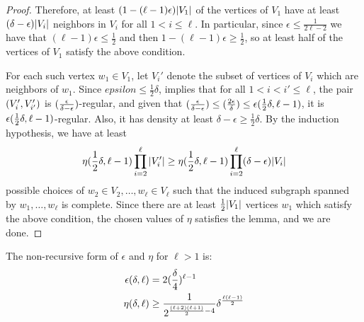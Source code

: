 \begin{lemma}
\begin{proof}
                Therefore, at least $(1 - (\ell -1) \epsilon) | V_1 |$ of the vertices of $V_1$ have at least
                $(\delta - \epsilon) | V_i |$ neighbors in $V_i$ for all $1 < i \leq \ell$.
                In particular, since $\epsilon \leq \frac{1}{2\ell - 2}$ we have that $(\ell - 1) \epsilon \leq \frac{1}{2}$
                and then $1 - (\ell - 1) \epsilon \geq \frac{1}{2}$, so at least half of the vertices of $V_1$ satisfy the
                above condition.

                For each such vertex $w_1 \in V_1$, let $V_i'$ denote the subset of vertices of $V_i$ which are neighbors
                of $w_1$.
                Since $epsilon \leq \frac{1}{2}\delta$,  implies that for all
                $1 < i < i' \leq \ell$, the pair $( V_i', V_{i'}' )$ is $( \frac{\epsilon}{\delta-\epsilon} )$-regular,
                and given that $( \frac{\epsilon}{\delta-\epsilon} ) \leq ( \frac{2\epsilon}{\delta} ) \leq \epsilon( \frac{1}{2}\delta, \ell-1 )$,
                it is $\epsilon( \frac{1}{2}\delta, \ell-1 )$-regular.
                Also, it has density at least $\delta - \epsilon \geq \frac{1}{2} \delta$.
                By the induction hypothesis, we have at least
                \[
                    \eta ( \frac{1}{2}\delta, \ell-1 ) \prod_{i=2}^\ell | V_i' |
                        \geq \eta ( \frac{1}{2}\delta, \ell-1 ) \prod_{i=2}^\ell ( \delta - \epsilon ) | V_i |
                \]
                possible choices of $w_2 \in V_2, \dots, w_\ell \in V_\ell$ such that the induced subgraph spanned by
                $w_1, \dots, w_\ell$ is complete.
                Since there are at least $\frac{1}{2} | V_1 |$ vertices $w_1$ which satisfy the above condition,
                the chosen values of $\eta$ satisfies the lemma, and we are done.
            \end{proof}
        \end{lemma}

        \begin{remark}
            The non-recursive form of $\epsilon$ and $\eta$ for $\ell > 1$ is:
            \begin{align*}
                \epsilon(\delta, \ell) & = 2 ( \frac{\delta}{4} )^{\ell-1} \\
                \eta(\delta, \ell) & \geq \frac{1}{2^{\frac{(\ell+2)(\ell+1)}{2}-4}} \delta^{\frac{\ell(\ell-1)}{2}}
            \end{align*}
        \end{remark}

